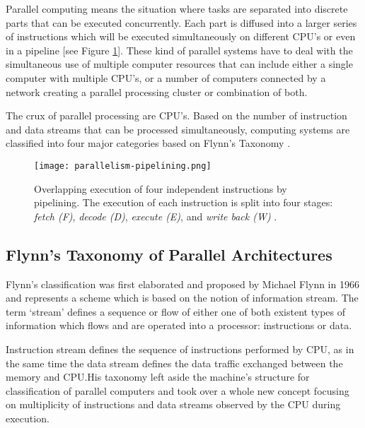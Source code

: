 Parallel computing means the situation where tasks are separated into discrete parts that can be executed concurrently. Each part is diffused into a larger series of instructions which will be executed simultaneously on different CPU's or even in a pipeline [see Figure \ref{fig:parallelismPipe}]. These kind of parallel systems have to deal with the simultaneous use of multiple computer resources that can include either a single computer with multiple CPU's, or a number of computers connected by a network creating a parallel processing cluster or combination of both.

The crux of parallel processing are CPU's. Based on the number of instruction and data streams that can be processed simultaneously, computing systems are classified into four major categories based on Flynn’s Taxonomy \parencite{internet7}.

\begin{figure}[h!]
	\centering
	\texttt{[image: parallelism-pipelining.png]}
	\caption{
		Overlapping execution of four independent instructions by pipelining. The execution of each instruction is split into four stages: \textit{fetch (F)}, \textit{decode (D)}, \textit{execute (E)}, and \textit{write back (W)} \parencite[see][Fig. 2.1, p11]{book1}.
	}
	\label{fig:parallelismPipe}
\end{figure}


\subsection{Flynn's Taxonomy of Parallel Architectures}

Flynn’s classification was first elaborated and proposed by Michael Flynn in 1966 and represents a scheme which is based on the notion of information stream. The term ‘stream’ defines a sequence or flow of either one of both existent types of information which flows and are operated into a processor: instructions or data. 

Instruction stream defines the sequence of instructions performed by CPU, as in the same time the data stream defines the data traffic exchanged between the memory and CPU.His taxonomy left aside the machine’s structure for classification of parallel computers and took over a whole new concept focusing on multiplicity of instructions and data streams observed by the CPU during execution.

